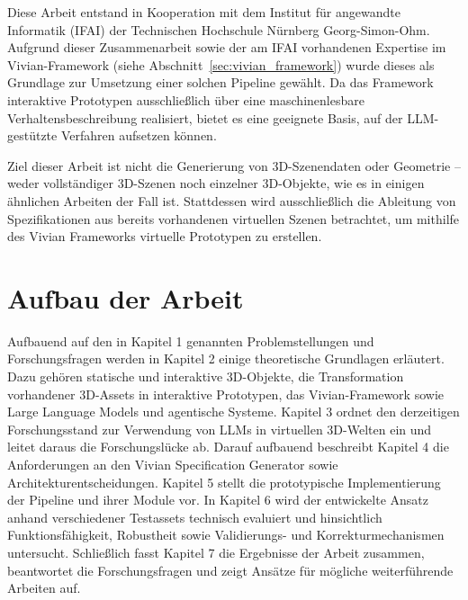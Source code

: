 Diese Arbeit entstand in Kooperation mit dem Institut für angewandte Informatik (IFAI) der Technischen Hochschule Nürnberg Georg-Simon-Ohm. Aufgrund dieser Zusammenarbeit sowie der am IFAI vorhandenen Expertise im Vivian-Framework (siehe Abschnitt~\ref{sec:vivian_framework}) wurde dieses als Grundlage zur Umsetzung einer solchen Pipeline gewählt. Da das Framework interaktive Prototypen ausschließlich über eine maschinenlesbare Verhaltensbeschreibung realisiert, bietet es eine geeignete Basis, auf der LLM-gestützte Verfahren aufsetzen können.

Ziel dieser Arbeit ist nicht die Generierung von 3D-Szenendaten oder Geometrie -- weder vollständiger 3D-Szenen noch einzelner 3D-Objekte, wie es in einigen ähnlichen Arbeiten der Fall ist. Stattdessen wird ausschließlich die Ableitung von Spezifikationen aus bereits vorhandenen virtuellen Szenen betrachtet, um mithilfe des Vivian Frameworks virtuelle Prototypen zu erstellen.


\section{Aufbau der Arbeit}

Aufbauend auf den in Kapitel 1 genannten Problemstellungen und Forschungsfragen werden in Kapitel 2 einige theoretische Grundlagen erläutert. Dazu gehören statische und interaktive 3D-Objekte, die Transformation vorhandener 3D-Assets in interaktive Prototypen, das Vivian-Framework sowie Large Language Models und agentische Systeme. Kapitel 3 ordnet den derzeitigen Forschungsstand zur Verwendung von LLMs in virtuellen 3D-Welten ein und leitet daraus die Forschungslücke ab. Darauf aufbauend beschreibt Kapitel 4 die Anforderungen an den Vivian Specification Generator sowie Architekturentscheidungen. Kapitel 5 stellt die prototypische Implementierung der Pipeline und ihrer Module vor. In Kapitel 6 wird der entwickelte Ansatz anhand verschiedener Testassets technisch evaluiert und hinsichtlich Funktionsfähigkeit, Robustheit sowie Validierungs- und Korrekturmechanismen untersucht. Schließlich fasst Kapitel 7 die Ergebnisse der Arbeit zusammen, beantwortet die Forschungsfragen und zeigt Ansätze für mögliche weiterführende Arbeiten auf.

